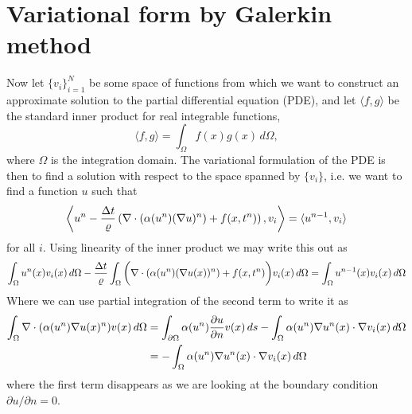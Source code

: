 \documentclass[12pt]{article}
\begin{document}
 \section{Variational form by Galerkin method}
 Now let $\{ v_i \}_{i=1}^N$ be some space of functions from which we want to construct an approximate solution to the partial differential equation (PDE), and let $\langle f,g\rangle$ be the standard inner product for real integrable functions, 
 \begin{equation}
  \langle f,g \rangle = \int_\Omega f(x) g(x) \, d\Omega,
 \end{equation}
where $\Omega$ is the integration domain. The variational formulation of the PDE is then to find a solution with respect to the space spanned by $\{v_i\}$, i.e. we want to find a function $u$ such that 
\begin{equation}
 \bigg\langle u^n - {\Delta t \over \varrho}\left(\nabla \cdot (\alpha(u^n) (\nabla u)^n) + f(x,t^n) \right), v_i \bigg\rangle = \langle u^{n-1}, v_i \rangle
\end{equation}
for all $i$. Using linearity of the inner product we may write this out as
\begin{equation}\label{eq:integraleq}
 \int_\Omega u^n(x)v_i(x) \, d\Omega - {\Delta t \over \varrho} \int_\Omega \bigg(\nabla \cdot (\alpha(u^n) (\nabla u(x))^n) + f(x,t^n)\bigg) v_i(x)\, d\Omega = \int_\Omega u^{n-1}(x)v_i(x) \, d\Omega
\end{equation}
Where we can use partial integration of the second term to write it as
\begin{align}
 \int_\Omega \nabla \cdot (\alpha(u^n)\nabla u(x)^n) v(x)\, d\Omega &= \int_{\partial \Omega} \alpha(u^n){\partial u \over \partial n} v(x) \, ds - \int_\Omega \alpha(u^n) \nabla u^n(x) \cdot \nabla v_i(x) \, d\Omega \\
 & = - \int_\Omega \alpha(u^n) \nabla u^n(x) \cdot \nabla v_i(x) \, d\Omega
\end{align}
where the first term disappears as we are looking at the boundary condition $\partial u / \partial n = 0$. 
\end{document}
